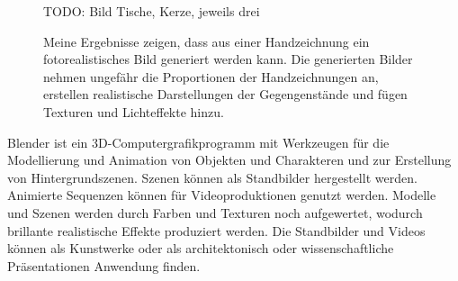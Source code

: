 \begin{figure}[h]
	\centering
	
	TODO: Bild Tische, Kerze, jeweils drei
	\caption[Eigene Beispiele]{Meine Ergebnisse zeigen, dass aus einer Handzeichnung ein fotorealistisches Bild generiert werden kann. Die generierten Bilder nehmen ungefähr die Proportionen der Handzeichnungen an, erstellen realistische Darstellungen der Gegengenstände und fügen Texturen und Lichteffekte hinzu.}
	\label{fig:myexamples}
\end{figure}

Blender ist ein 3D-Computergrafikprogramm mit Werkzeugen für die Modellierung und Animation von Objekten und Charakteren und zur Erstellung von Hintergrundszenen. Szenen können als Standbilder hergestellt werden. Animierte Sequenzen können für Videoproduktionen genutzt werden. Modelle und Szenen werden durch Farben und Texturen noch aufgewertet, wodurch brillante realistische Effekte produziert werden. Die Standbilder und Videos können als Kunstwerke oder als architektonisch oder wissenschaftliche Präsentationen Anwendung finden. \cite{blain2020blender}
